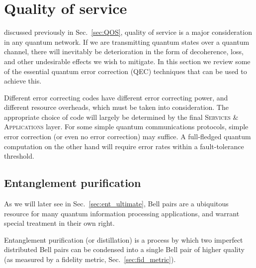 %
%

\section{Quality of service}\label{sec:QOS_chap}

 discussed previously in Sec.~\ref{sec:QOS}, quality of service is a major consideration in any quantum network. If we are transmitting quantum states over a quantum channel, there will inevitably be deterioration in the form of decoherence, loss, and other undesirable effects we wish to mitigate. In this section we review some of the essential quantum error correction (QEC) techniques that can be used to achieve this.

Different error correcting codes have different error correcting power, and different resource overheads, which must be taken into consideration. The appropriate choice of code will largely be determined by the final \textsc{Services \& Applications} layer. For some simple quantum communications protocols, simple error correction (or even no error correction) may suffice. A full-fledged quantum computation on the other hand will require error rates within a fault-tolerance threshold.

%
%

\subsection{Entanglement purification}

As we will later see in Sec.~\ref{sec:ent_ultimate}, Bell pairs are a ubiquitous resource for many quantum information processing applications, and warrant special treatment in their own right.

Entanglement purification (or distillation) is a process by which two imperfect distributed Bell pairs can be condensed into a single Bell pair of higher quality (as measured by a fidelity metric, Sec.~\ref{sec:fid_metric}).

